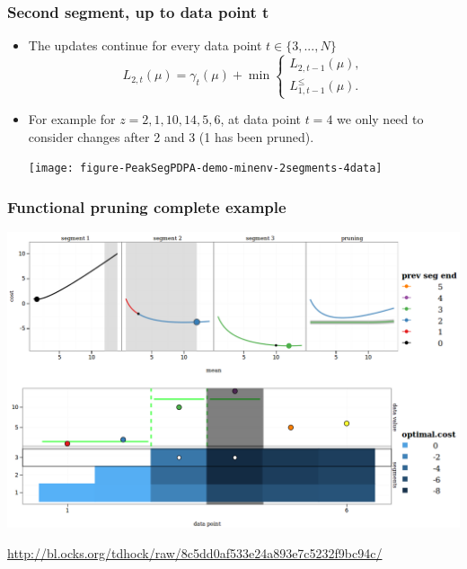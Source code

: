 \documentclass{beamer}
\begin{document}
\begin{frame}
  \frametitle{Second segment, up to data point t}
  \begin{itemize}
  \item The updates continue for every data point $t\in\{3, ..., N\}$
    \begin{equation*}
      L_{2,t}(\mu) =  \gamma_t(\mu) + \min
      \begin{cases}
        L_{2,t-1}(\mu),\\
        L_{1,t-1}^{\leq}(\mu).
      \end{cases}
    \end{equation*}
  \item For example for $z = 2, 1, 10, 14, 5, 6$, at data point $t=4$
    we only need to consider changes after 2 and 3 (1 has been
    pruned).
    \begin{center}
      \texttt{[image: figure-PeakSegPDPA-demo-minenv-2segments-4data]}
    \end{center}
  \end{itemize}
\end{frame}


\begin{frame}
  \frametitle{Functional pruning complete example}
\includegraphics[width=\textwidth]{screenshot-PDPA-demo}

  \url{http://bl.ocks.org/tdhock/raw/8c5dd0af533e24a893e7c5232f9bc94c/}
\end{frame}
\end{document}
